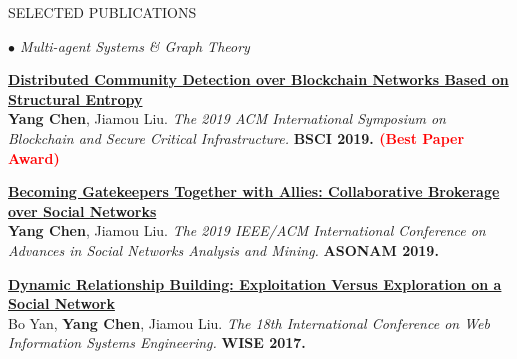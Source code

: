 \documentclass{resume} %
\begin{document}
\begin{rSection}{SELECTED PUBLICATIONS}
\begin{rSubsection}{\large\em $\bullet$ Multi-agent Systems \& Graph Theory}{}{}{}
\item {\href{https://www.researchgate.net/profile/Yang-Chen-67/publication/334358789_Distributed_Community_Detection_over_Blockchain_Networks_Based_on_Structural_Entropy/links/5d281b20299bf1547cadb905/Distributed-Community-Detection-over-Blockchain-Networks-Based-on-Structural-Entropy.pdf}{\bf Distributed Community Detection over Blockchain Networks Based on Structural Entropy}}\\
		\textbf{Yang Chen}, Jiamou Liu. {\em The 2019 ACM International Symposium on Blockchain and Secure Critical Infrastructure.} \textbf{BSCI 2019. \textcolor{red}{(Best Paper Award)}}\\
	\item {\href{https://github.com/PolynomialTime/ASONAM2019/blob/master/asonam2019.pdf}{\bf Becoming Gatekeepers Together with Allies: Collaborative Brokerage over Social Networks}}\\
		\textbf{Yang Chen}, Jiamou Liu. {\em The 2019 IEEE/ACM International Conference on Advances in Social Networks Analysis and Mining.} \textbf{ASONAM 2019.}\\
	\item {\href{https://github.com/PolynomialTime/WISE2017/blob/master/WISE2017.pdf}{\bf Dynamic Relationship Building: Exploitation Versus Exploration on a Social Network}}\\
		Bo Yan, \textbf{Yang Chen}, Jiamou Liu. {\em The 18th International Conference on Web Information Systems Engineering.} \textbf{WISE 2017.}\\
\end{rSubsection}



\end{rSection}
\end{document}
